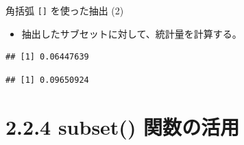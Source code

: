 \documentclass[
  ignorenonframetext,
]{beamer}
\newenvironment{Shaded}{\begin{snugshade}}{\end{snugshade}}
\newcommand{\CommentTok}[1]{\textcolor[rgb]{0.56,0.35,0.01}{\textit{#1}}}
\newcommand{\FunctionTok}[1]{\textcolor[rgb]{0.00,0.00,0.00}{#1}}
\newcommand{\NormalTok}[1]{#1}
\newcommand{\SpecialCharTok}[1]{\textcolor[rgb]{0.00,0.00,0.00}{#1}}
\providecommand{\tightlist}{%
  \setlength{\itemsep}{0pt}\setlength{\parskip}{0pt}}
\begin{document}
\begin{frame}[fragile]{角括弧 \texttt{{[}{]}} を使った抽出 (2)}
\protect\hypertarget{ux89d2ux62ecux5f27-ux3092ux4f7fux3063ux305fux62bdux51fa-2}{}
\begin{itemize}
\tightlist
\item
  抽出したサブセットに対して、統計量を計算する。
\end{itemize}

\scriptsize

\begin{Shaded}
\end{Shaded}

\begin{verbatim}
## [1] 0.06447639
\end{verbatim}

\begin{Shaded}
\end{Shaded}

\begin{verbatim}
## [1] 0.09650924
\end{verbatim}

\normalsize
\end{frame}

\hypertarget{subset-ux95a2ux6570ux306eux6d3bux7528}{%
\section{2.2.4 subset()
関数の活用}\label{subset-ux95a2ux6570ux306eux6d3bux7528}}
\end{document}
